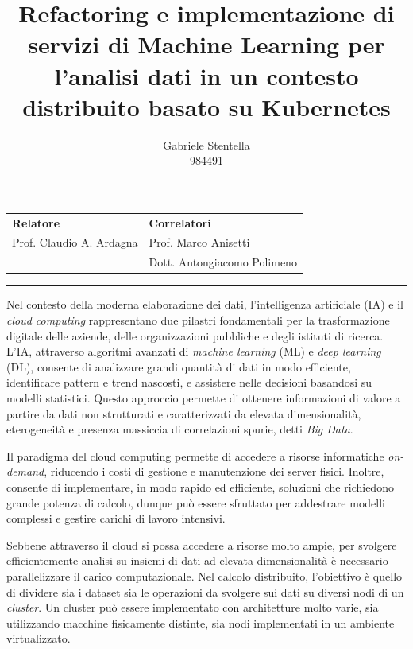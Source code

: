\documentclass[11pt]{article}
\title{Refactoring e implementazione di servizi di Machine Learning per l'analisi dati in un contesto distribuito basato su Kubernetes}
\author{Gabriele Stentella \\ 984491}
\date{}
\begin{document}
\maketitle

\begin{tabularx}{.95\linewidth}{X X}
\textbf{Relatore} & \textbf{Correlatori} \\
\large{Prof. Claudio A. Ardagna} & \large{Prof. Marco Anisetti} \\
& \large{Dott. Antongiacomo Polimeno} \\
\end{tabularx}

\vspace{5pt}
\hrule
\vspace{6pt}

Nel contesto della moderna elaborazione dei dati, l'intelligenza artificiale (IA) e il \emph{cloud computing} rappresentano due pilastri fondamentali per la trasformazione digitale delle aziende, delle organizzazioni pubbliche e degli istituti di ricerca. L'IA, attraverso algoritmi avanzati di \emph{machine learning} (ML) e \emph{deep learning} (DL), consente di analizzare grandi quantità di dati in modo efficiente, identificare pattern e trend nascosti, e assistere nelle decisioni basandosi su modelli statistici. Questo approccio permette di ottenere informazioni di valore a partire da dati non strutturati e caratterizzati da elevata dimensionalità, eterogeneità e presenza massiccia di correlazioni spurie, detti \emph{Big Data}.

Il paradigma del cloud computing permette di accedere a risorse informatiche \emph{on-demand}, riducendo i costi di gestione e manutenzione dei server fisici. Inoltre, consente di implementare, in modo rapido ed efficiente, soluzioni che richiedono grande potenza di calcolo, dunque può essere sfruttato per addestrare modelli complessi e gestire carichi di lavoro intensivi.

Sebbene attraverso il cloud si possa accedere a risorse molto ampie, per svolgere efficientemente analisi su insiemi di dati ad elevata dimensionalità è necessario parallelizzare il carico computazionale. Nel calcolo distribuito, l'obiettivo è quello di dividere sia i dataset sia le operazioni da svolgere sui dati su diversi nodi di un \textit{cluster}. Un cluster può essere implementato con architetture molto varie, sia utilizzando macchine fisicamente distinte, sia nodi implementati in un ambiente virtualizzato.
\end{document}
